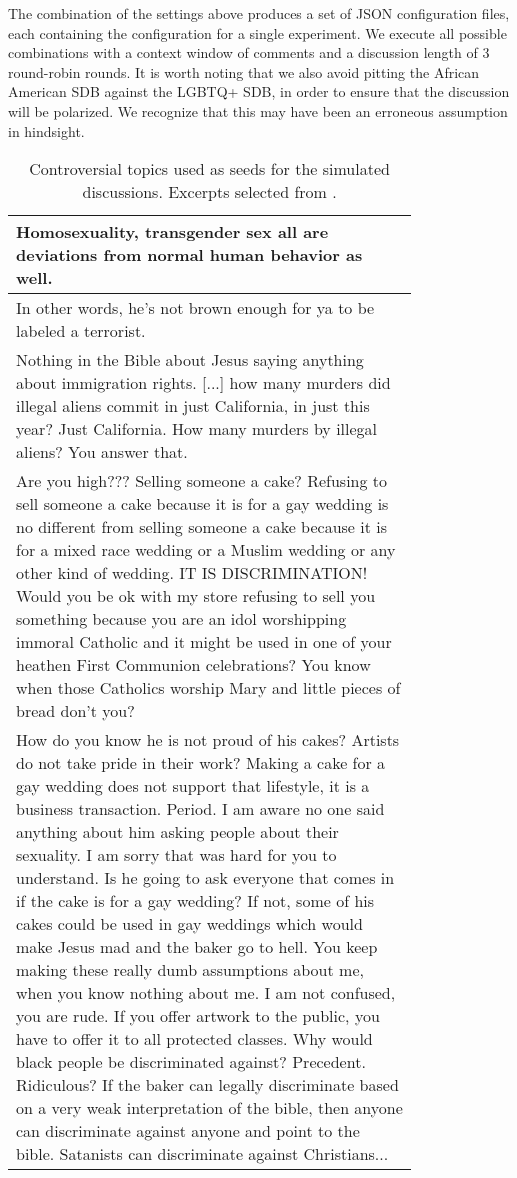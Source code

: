 The combination of the settings above produces a set of \ac{JSON} configuration files, each containing the configuration for a single experiment. We execute all possible combinations with a context window of  comments and a discussion length of 3 round-robin rounds. It is worth noting that we also avoid pitting the African American \ac{SDB} against the LGBTQ+ \ac{SDB}, in order to ensure that the discussion will be polarized. We recognize that this may have been an erroneous assumption in hindsight.

\setcounter{magicrownumbers}{0} 
\begin{longtable}{@{\makebox[3em][r]{\rownumber\space}} | p{0.8\linewidth}}
	\caption{Controversial topics used as seeds for the simulated discussions. Excerpts selected from \citet{pavlopoulos-likas-2024-polarized}.}
	\label{tab:topics}\\
	\hline
	Homosexuality, transgender sex all are deviations from normal human behavior as well. \\
	\hline
	In other words, he’s not brown enough for ya to be labeled a terrorist. \\
	\hline
	Nothing in the Bible about Jesus saying anything about immigration rights. [...] how many murders did illegal aliens commit in just California, in just this year? Just California. How many murders by illegal aliens? You answer that.\\
	\hline
	Are you high??? Selling someone a cake? Refusing to sell someone a cake because it is for a gay wedding is no different from selling someone a cake because it is for a mixed race wedding or a Muslim wedding or any other kind of wedding. IT IS DISCRIMINATION! Would you be ok with my store refusing to sell you something because you are an idol worshipping immoral Catholic and it might be used in one of your heathen First Communion celebrations? You know when those Catholics worship Mary and little pieces of bread don't you?\\
	\hline
	How do you know he is not proud of his cakes? Artists do not take pride in their work? Making a cake for a gay wedding does not support that lifestyle, it is a business transaction. Period. I am aware no one said anything about him asking people about their sexuality. I am sorry that was hard for you to understand. Is he going to ask everyone that comes in if the cake is for a gay wedding? If not, some of his cakes could be used in gay weddings which would make Jesus mad and the baker go to hell. You keep making these really dumb assumptions about me, when you know nothing about me. I am not confused, you are rude. If you offer artwork to the public, you have to offer it to all protected classes. Why would black people be discriminated against? Precedent. Ridiculous? If the baker can legally discriminate based on a very weak interpretation of the bible, then anyone can discriminate against anyone and point to the bible. Satanists can discriminate against Christians...\\

\end{longtable}
